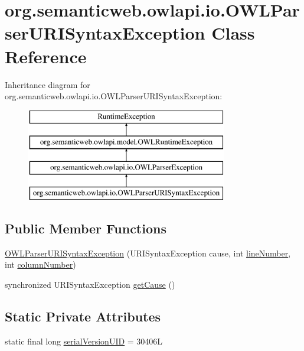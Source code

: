 \hypertarget{classorg_1_1semanticweb_1_1owlapi_1_1io_1_1_o_w_l_parser_u_r_i_syntax_exception}{\section{org.\-semanticweb.\-owlapi.\-io.\-O\-W\-L\-Parser\-U\-R\-I\-Syntax\-Exception Class Reference}
\label{classorg_1_1semanticweb_1_1owlapi_1_1io_1_1_o_w_l_parser_u_r_i_syntax_exception}
}
Inheritance diagram for org.\-semanticweb.\-owlapi.\-io.\-O\-W\-L\-Parser\-U\-R\-I\-Syntax\-Exception\-:\begin{figure}[H]
\begin{center}
\leavevmode
\includegraphics[height=4.000000cm]{classorg_1_1semanticweb_1_1owlapi_1_1io_1_1_o_w_l_parser_u_r_i_syntax_exception}
\end{center}
\end{figure}
\subsection*{Public Member Functions}
\begin{DoxyCompactItemize}
\item 
\hyperlink{classorg_1_1semanticweb_1_1owlapi_1_1io_1_1_o_w_l_parser_u_r_i_syntax_exception_add0ba129f47715b95bbe25b0be70490d}{O\-W\-L\-Parser\-U\-R\-I\-Syntax\-Exception} (U\-R\-I\-Syntax\-Exception cause, int \hyperlink{classorg_1_1semanticweb_1_1owlapi_1_1io_1_1_o_w_l_parser_exception_a5a5d515eefd8c2871627e152d86c03c2}{line\-Number}, int \hyperlink{classorg_1_1semanticweb_1_1owlapi_1_1io_1_1_o_w_l_parser_exception_af0ad50fb6962ba9b17a4e358e1b82d38}{column\-Number})
\item 
synchronized U\-R\-I\-Syntax\-Exception \hyperlink{classorg_1_1semanticweb_1_1owlapi_1_1io_1_1_o_w_l_parser_u_r_i_syntax_exception_ad0579ee9349338cd00ccd9514f99078f}{get\-Cause} ()
\end{DoxyCompactItemize}
\subsection*{Static Private Attributes}
\begin{DoxyCompactItemize}
\item 
static final long \hyperlink{classorg_1_1semanticweb_1_1owlapi_1_1io_1_1_o_w_l_parser_u_r_i_syntax_exception_a9b93e28b037d5f312b4a6e3ddf86809b}{serial\-Version\-U\-I\-D} = 30406\-L
\end{DoxyCompactItemize}


